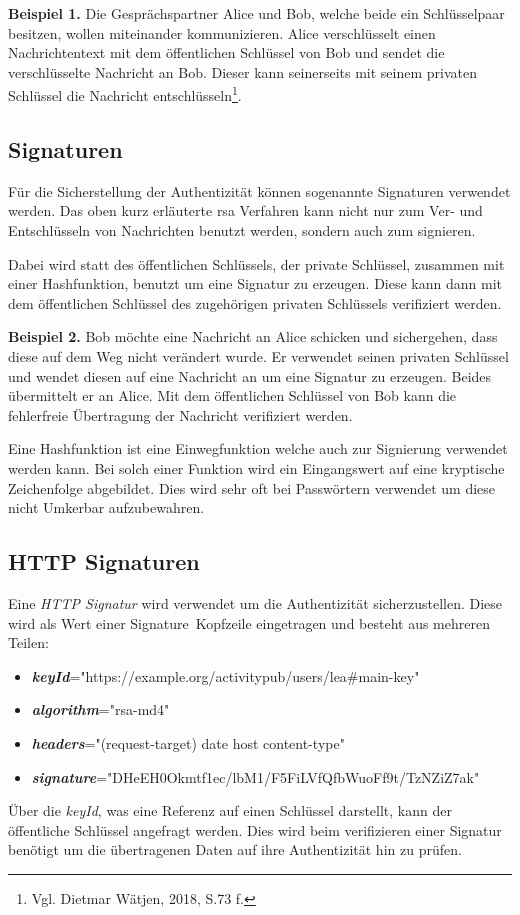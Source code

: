 {	\textbf{Beispiel 1.} Die Gesprächspartner Alice und Bob, welche beide ein Schlüsselpaar besitzen, wollen miteinander kommunizieren. Alice verschlüsselt einen Nachrichtentext mit dem öffentlichen Schlüssel von Bob und sendet die verschlüsselte Nachricht an Bob. Dieser kann seinerseits mit seinem privaten Schlüssel die Nachricht entschlüsseln\footnote{Vgl. Dietmar Wätjen, 2018, S.73 f.}.\par

	\subsection{Signaturen}
	Für die Sicherstellung der Authentizität können sogenannte Signaturen verwendet werden. Das oben kurz erläuterte \gls{rsa} Verfahren kann nicht nur zum Ver- und Entschlüsseln von Nachrichten benutzt werden, sondern auch zum signieren.\par
	Dabei wird statt des öffentlichen Schlüssels, der private Schlüssel, zusammen mit einer Hashfunktion, benutzt um eine Signatur zu erzeugen. Diese kann dann mit dem öffentlichen Schlüssel des zugehörigen privaten Schlüssels verifiziert werden.\par
	
	\textbf{Beispiel 2.} Bob möchte eine Nachricht an Alice schicken und sichergehen, dass diese auf dem Weg nicht verändert wurde. Er verwendet seinen privaten Schlüssel und wendet diesen auf eine Nachricht an um eine Signatur zu erzeugen. Beides übermittelt er an Alice. Mit dem öffentlichen Schlüssel von Bob kann die fehlerfreie Übertragung der Nachricht verifiziert werden.\par
	
	Eine Hashfunktion ist eine Einwegfunktion welche auch zur Signierung verwendet werden kann. Bei solch einer Funktion wird ein Eingangswert auf eine kryptische Zeichenfolge abgebildet. Dies wird sehr oft bei Passwörtern verwendet um diese nicht Umkerbar aufzubewahren.\par

	\subsection{HTTP Signaturen}
	\label{subsec:http-signaturen}
	Eine \textit{HTTP Signatur} wird verwendet um die Authentizität sicherzustellen. Diese wird als Wert einer \glqq Signature\grqq~Kopfzeile eingetragen und besteht aus mehreren Teilen:
	\begin{itemize}
		\item \textit{\textbf{keyId}}="https://example.org/activitypub/users/lea\#main-key"
		\item \textit{\textbf{algorithm}}="rsa-md4"
		\item \textit{\textbf{headers}}="(request-target) date host content-type"
		\item \textit{\textbf{signature}}="DHeEH0Okmtf1ec/lbM1/F5FiLVfQfbWuoFf9t/TzNZiZ7ak"
	\end{itemize}
	Über die \textit{keyId}, was eine Referenz auf einen Schlüssel darstellt, kann der öffentliche Schlüssel angefragt werden. Dies wird beim verifizieren einer Signatur benötigt um die übertragenen Daten auf ihre Authentizität hin zu prüfen.\par
	
}
